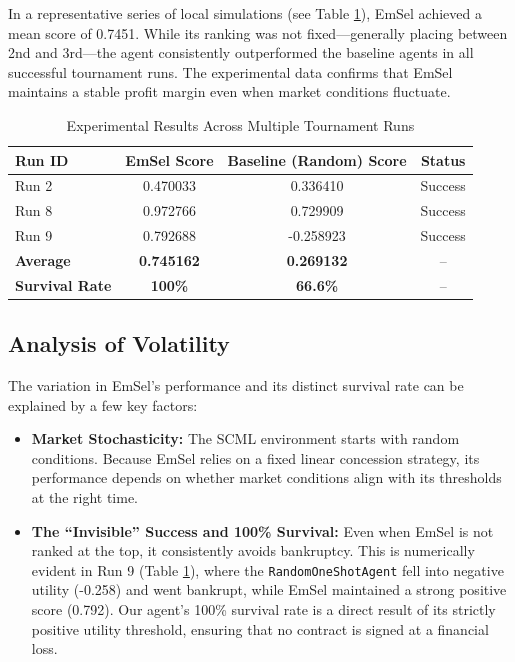 \documentclass[a4paper,11pt]{article}
\begin{document}
	In a representative series of local simulations (see Table \ref{tab:tournament_results}), EmSel achieved a mean score of 0.7451. While its ranking was not fixed—generally placing between 2nd and 3rd—the agent consistently outperformed the baseline agents in all successful tournament runs. The experimental data confirms that EmSel maintains a stable profit margin even when market conditions fluctuate.
	
	\begin{table}[h]
		\centering
		\caption{Experimental Results Across Multiple Tournament Runs}
		\label{tab:tournament_results}
		\begin{tabular}{|l|c|c|c|}
			\hline
			\textbf{Run ID} & \textbf{EmSel Score} & \textbf{Baseline (Random) Score} & \textbf{Status} \\ \hline
			Run 2 & 0.470033 & 0.336410 & Success \\ \hline
			Run 8 & 0.972766 & 0.729909 & Success \\ \hline
			Run 9 & 0.792688 & -0.258923 & Success \\ \hline
			\textbf{Average} & \textbf{0.745162} & \textbf{0.269132} & -- \\ \hline
			\textbf{Survival Rate} & \textbf{100\%} & \textbf{66.6\%} & -- \\ \hline
		\end{tabular}
	\end{table}
	
	\subsection{Analysis of Volatility}
	
	The variation in EmSel’s performance and its distinct survival rate can be explained by a few key factors: 
	
	\begin{itemize}
		\item \textbf{Market Stochasticity:} The SCML environment starts with random conditions. Because EmSel relies on a fixed linear concession strategy, its performance depends on whether market conditions align with its thresholds at the right time. 
		
		\item \textbf{The ``Invisible'' Success and 100\% Survival:} Even when EmSel is not ranked at the top, it consistently avoids bankruptcy. This is numerically evident in Run 9 (Table \ref{tab:tournament_results}), where the \texttt{RandomOneShotAgent} fell into negative utility (-0.258) and went bankrupt, while EmSel maintained a strong positive score (0.792). Our agent's 100\% survival rate is a direct result of its strictly positive utility threshold, ensuring that no contract is signed at a financial loss.
	\end{itemize}
	
\end{document}
